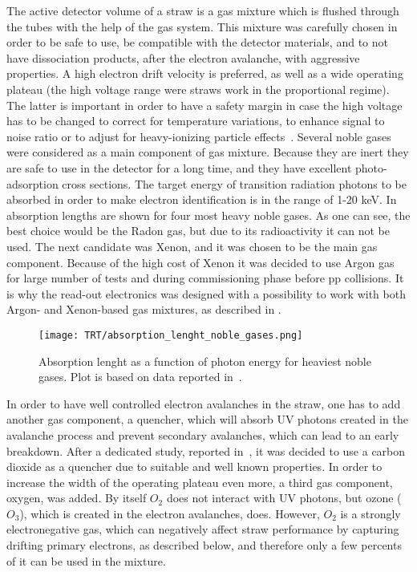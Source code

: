 The active detector volume of a straw is a gas mixture which is flushed through the tubes with the help of the gas system.
This mixture was carefully chosen in order to be safe to use, be compatible with the detector materials, and to not have dissociation products, after the electron avalanche,
with aggressive properties.
A high electron drift velocity is preferred, as well as a wide operating plateau (the high voltage range were straws work in the proportional regime). 
The latter is important in order to have a
safety margin in case the high voltage has to be changed to correct for temperature variations, to enhance signal to noise ratio or to adjust for 
heavy-ionizing particle effects~\cite{Abat:2008zza}.
Several noble gases were considered as a main component of gas mixture. Because they are inert they are safe to use in the detector for a long time, and they have 
excellent photo-adsorption cross sections.
The target energy of transition radiation photons to be absorbed in order to make electron identification is in the range of 1-20 keV.
In  absorption lengths are shown for four most heavy noble gases.
As one can see, the best choice would be the Radon gas, but due to its radioactivity it can not be used.
The next candidate was Xenon, and it was chosen to be the main gas component.
Because of the high cost of Xenon it was decided to use Argon gas for large number of tests and during commissioning phase before pp collisions. It is why the read-out electronics was
designed with a possibility to work with both Argon- and Xenon-based gas mixtures, as described in .

\begin{figure}
\centering
\texttt{[image: TRT/absorption\_lenght\_noble\_gases.png]}
\caption{ 
  Absorption lenght as a function of photon energy for heaviest noble gases. Plot is based on data reported in~\cite{Hubbell:353989}.
}
\label{fig:absorption_lenght}
\end{figure}

In order to have well controlled electron avalanches in the straw, one has to add another gas component, a quencher, 
which will absorb UV photons created in the avalanche process and prevent secondary avalanches, which can lead to an early breakdown.
After a dedicated study, reported in~\cite{Abat:2008zza}, it was decided to use a carbon dioxide as a quencher due to suitable and well known properties.
In order to increase the width of the operating plateau even more, a third gas component, oxygen, was added.
By itself $O_2$ does not interact with UV photons, but ozone ($O_3$), which is created in the electron avalanches, does.
However, $O_2$ is a strongly electronegative gas, which can negatively affect straw performance by capturing drifting primary electrons, as described below,
and therefore only a few percents of it can be used in the mixture.
 
